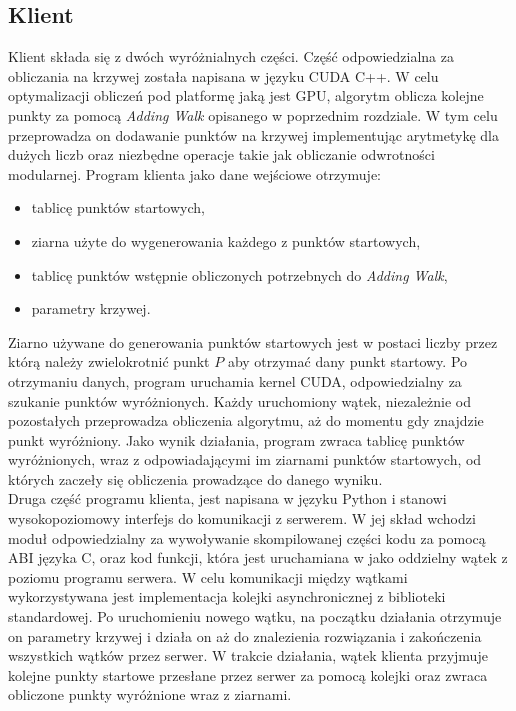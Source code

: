 \subsection{Klient}
Klient składa się z dwóch wyróżnialnych części.
Część odpowiedzialna za obliczania na krzywej została napisana w języku CUDA C++.
W celu optymalizacji obliczeń pod platformę jaką jest GPU, algorytm oblicza kolejne punkty
za pomocą \textit{Adding Walk} opisanego w poprzednim rozdziale. W tym celu przeprowadza
on dodawanie punktów na krzywej implementując arytmetykę dla dużych liczb oraz niezbędne operacje
takie jak obliczanie odwrotności modularnej.
Program klienta jako dane wejściowe otrzymuje:
\begin{itemize}
    \item tablicę punktów startowych,
    \item ziarna użyte do wygenerowania każdego z punktów startowych,
    \item tablicę punktów wstępnie obliczonych potrzebnych do \textit{Adding Walk},
    \item parametry krzywej.  
\end{itemize}
Ziarno używane do generowania punktów startowych jest w postaci liczby
przez którą należy zwielokrotnić punkt $P$ aby otrzymać dany punkt startowy.
Po otrzymaniu danych, program uruchamia kernel CUDA, odpowiedzialny za szukanie punktów wyróżnionych.
Każdy uruchomiony wątek, niezależnie od pozostałych przeprowadza obliczenia algorytmu, aż do momentu
gdy znajdzie punkt wyróżniony.
Jako wynik działania, program zwraca
tablicę punktów wyróżnionych, wraz z odpowiadającymi im ziarnami punktów startowych, od których zaczeły
się obliczenia prowadzące do danego wyniku. \\
Druga część programu klienta, jest napisana w języku Python i stanowi wysokopoziomowy interfejs do komunikacji
z serwerem. W jej skład wchodzi moduł odpowiedzialny za wywoływanie skompilowanej części kodu za pomocą ABI języka C,
oraz kod funkcji, która jest uruchamiana w jako oddzielny wątek z poziomu programu serwera. W celu komunikacji
między wątkami wykorzystywana jest implementacja kolejki asynchronicznej z biblioteki standardowej.
Po uruchomieniu nowego wątku, na początku działania otrzymuje on parametry krzywej i działa
on aż do znalezienia rozwiązania i zakończenia wszystkich wątków przez serwer.
W trakcie działania, wątek klienta przyjmuje kolejne punkty startowe przesłane przez serwer za pomocą kolejki
oraz zwraca obliczone punkty wyróżnione wraz z ziarnami.


